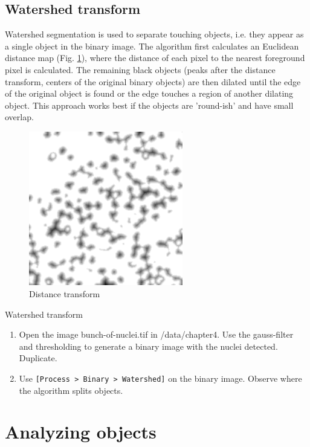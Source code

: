 \subsection{Watershed transform}
Watershed segmentation is used to separate touching objects, i.e. they appear as a single object in the binary image. The algorithm first calculates an Euclidean distance map (Fig. \ref{fig:distance-transform}), where the distance of each pixel to the nearest foreground pixel is calculated. The remaining black objects (peaks after the distance transform, centers of the original binary objects) are then dilated until the edge of the original object is found or the edge touches a region of another dilating object. This approach works best if the objects are 'round-ish' and have small overlap.

\begin{figure}[ht]
	\centering
		\includegraphics[width=0.60\textwidth]{mod3/figures/distance-transform.png}
	\caption{Distance transform}
	\label{fig:distance-transform}
\end{figure}

\begin{taskbox}{Watershed transform}
\begin{enumerate}
	\item Open the image bunch-of-nuclei.tif in /data/chapter4. Use the gauss-filter and thresholding to generate a binary image with the nuclei detected. Duplicate. 
	\item Use \texttt{[Process > Binary > Watershed]} on the binary image. Observe where the algorithm splits objects.
	\end{enumerate}
\end{taskbox}

\section{Analyzing objects}

